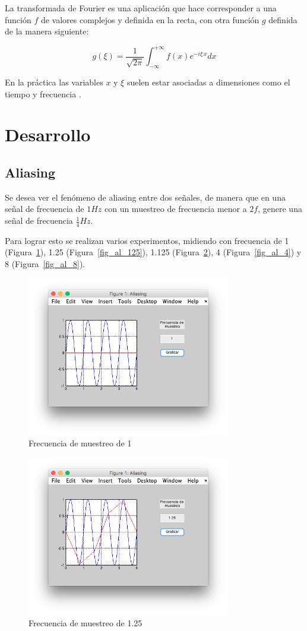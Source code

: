 \documentclass[comsoc, journal]{IEEEtran}
\begin{document}
La transformada de Fourier es una aplicación que hace corresponder a una función $f$ de valores complejos y definida en la recta, con otra función $g$ definida de la manera siguiente:

$$g(\xi ) =  \frac{1}{\sqrt{2\pi}}\int_{-\infty}^{+\infty} f(x)e^{-i\xi\,x} dx$$

En la práctica las variables $x$ y $\xi$ suelen estar asociadas a dimensiones como el tiempo y frecuencia \cite{spiegel}.

\section{Desarrollo}
\subsection{Aliasing}
Se desea ver el fenómeno de aliasing entre dos señales, de manera que en una señal de frecuencia de $1Hz$ con un muestreo de frecuencia menor a $2f$, genere una señal de frecuencia $\frac{1}{4}Hz$.

Para lograr esto se realizan varios experimentos, midiendo con frecuencia de 1 (Figura~\ref{fig_al_1}), 1.25 (Figura~\ref{fig_al_125}), 1.125 (Figura~\ref{fig_al_25}), 4 (Figura~\ref{fig_al_4}) y 8 (Figura~\ref{fig_al_8}).

\begin{figure}[!t]
\centering
\includegraphics[width=3.5in]{imgs/aliasing_1.png}
\caption{Frecuencia de muestreo de 1}
\label{fig_al_1}
\end{figure}

\begin{figure}[!t]
\centering
\includegraphics[width=3.5in]{imgs/aliasing_25.png}
\caption{Frecuencia de muestreo de 1.25}
\label{fig_al_25}
\end{figure}
\end{document}
